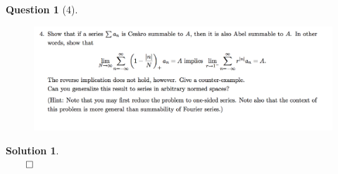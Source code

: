 \documentclass{article} %
\theoremstyle{quest}
\newtheorem*{question}{Question}
\newtheorem*{solution}{Solution}
\begin{document}
\bigskip

\begin{question}[4]
\hfill
\begin{figure}[h!]
  \centering
    \includegraphics[width=1\textwidth]{HA-3-4.png}
\end{figure}
\end{question}
\begin{solution} \hfill \\
 
\hfill $\qed$
\end{solution}

\bigskip
\end{document}

